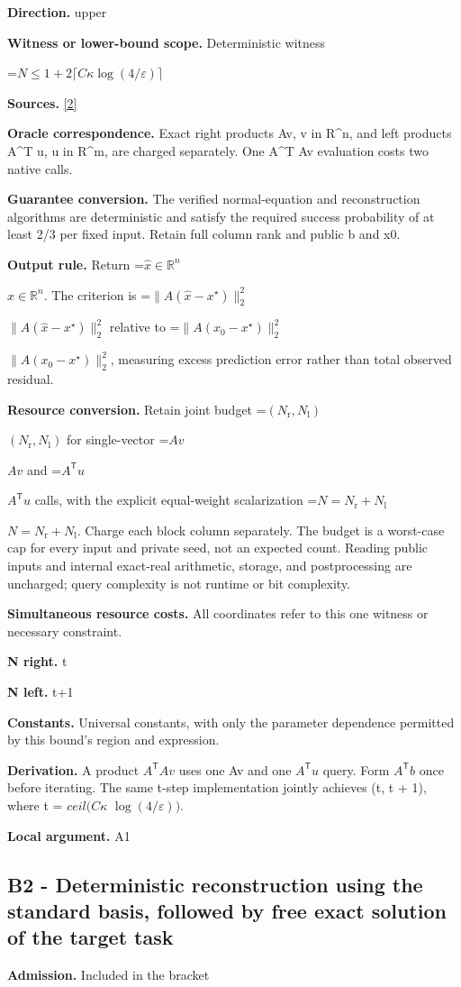 \documentclass[10pt,a4paper]{article}
\newcommand{\AtlasMath}[1]{\par\begingroup\centering\setbox0=\hbox{$\displaystyle #1$}\ifdim\wd0>1.4\linewidth\typeout{ATLAS WIDE FORMULA: \the\wd0}\fi\ifdim\wd0>\linewidth\resizebox{\linewidth}{!}{\box0}\else\box0\fi\par\endgroup}
\newcommand{\AtlasInlineMath}[1]{\begingroup\setbox0=\hbox{$#1$}\ifdim\wd0>.4\linewidth\endgroup\AtlasMath{#1}\else\endgroup$#1$\fi}
\begin{document}
\textbf{Direction.} upper

\textbf{Witness or lower-bound scope.} Deterministic witness

\AtlasMath{N\le1+2\lceil C\kappa\log(4/\varepsilon)\rceil}
\textbf{Sources.} \href{https://arxiv.org/pdf/1708.07788v2}{[2]}

\textbf{Oracle correspondence.} Exact right products Av, v in R\textasciicircum{}n, and left products A\textasciicircum{}T u, u in R\textasciicircum{}m, are charged separately. One A\textasciicircum{}T Av evaluation costs two native calls.

\textbf{Guarantee conversion.} The verified normal-equation and reconstruction algorithms are deterministic and satisfy the required success probability of at least 2/3 per fixed input. Retain full column rank and public b and x0.

\textbf{Output rule.} Return \AtlasInlineMath{\widehat x\in\mathbb R^n}. The criterion is \AtlasInlineMath{\|A(\widehat x-x^\star)\|_2^2} relative to \AtlasInlineMath{\|A(x_0-x^\star)\|_2^2}, measuring excess prediction error rather than total observed residual.

\textbf{Resource conversion.} Retain joint budget \AtlasInlineMath{(N_{\mathrm r},N_{\mathrm l})} for single-vector \AtlasInlineMath{Av} and \AtlasInlineMath{A^{\mathsf T}u} calls, with the explicit equal-weight scalarization \AtlasInlineMath{N=N_{\mathrm r}+N_{\mathrm l}}. Charge each block column separately. The budget is a worst-case cap for every input and private seed, not an expected count. Reading public inputs and internal exact-real arithmetic, storage, and postprocessing are uncharged; query complexity is not runtime or bit complexity.

\textbf{Simultaneous resource costs.} All coordinates refer to this one witness or necessary constraint.

\textbf{N right.} t

\textbf{N left.} t+1

\textbf{Constants.} Universal constants, with only the parameter dependence permitted by this bound’s region and expression.

\textbf{Derivation.} A product $A^{\mathsf T}Av$ uses one Av and one $A^{\mathsf T}u$ query. Form $A^{\mathsf T}b$ once before iterating. The same t-step implementation jointly achieves (t, t + 1), where t = $ceil(C\kappa$ $\log(4/\varepsilon ))$.

\textbf{Local argument.} A1

\subsection{B2 - Deterministic reconstruction using the standard basis, followed by free exact solution of the target task}
\textbf{Admission.} Included in the bracket
\end{document}
